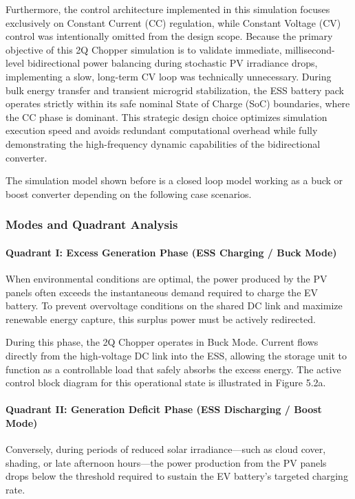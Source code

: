 Furthermore, the control architecture implemented in this simulation focuses exclusively on Constant Current (CC) regulation, while Constant Voltage (CV) control was intentionally omitted from the design scope. Because the primary objective of this 2Q Chopper simulation is to validate immediate, millisecond-level bidirectional power balancing during stochastic PV irradiance drops, implementing a slow, long-term CV loop was technically unnecessary. During bulk energy transfer and transient microgrid stabilization, the ESS battery pack operates strictly within its safe nominal State of Charge (SoC) boundaries, where the CC phase is dominant. This strategic design choice optimizes simulation execution speed and avoids redundant computational overhead while fully demonstrating the high-frequency dynamic capabilities of the bidirectional converter.

The simulation model shown before is a closed loop model working as a buck or boost converter depending on the following case scenarios.

\subsubsection{Modes and Quadrant Analysis}

\paragraph{Quadrant I: Excess Generation Phase (ESS Charging / Buck Mode)}
When environmental conditions are optimal, the power produced by the PV panels often exceeds the instantaneous demand required to charge the EV battery. To prevent overvoltage conditions on the shared DC link and maximize renewable energy capture, this surplus power must be actively redirected.

During this phase, the 2Q Chopper operates in Buck Mode. Current flows directly from the high-voltage DC link into the ESS, allowing the storage unit to function as a controllable load that safely absorbs the excess energy. The active control block diagram for this operational state is illustrated in Figure 5.2a.

\paragraph{Quadrant II: Generation Deficit Phase (ESS Discharging / Boost Mode)}
Conversely, during periods of reduced solar irradiance---such as cloud cover, shading, or late afternoon hours---the power production from the PV panels drops below the threshold required to sustain the EV battery's targeted charging rate.

